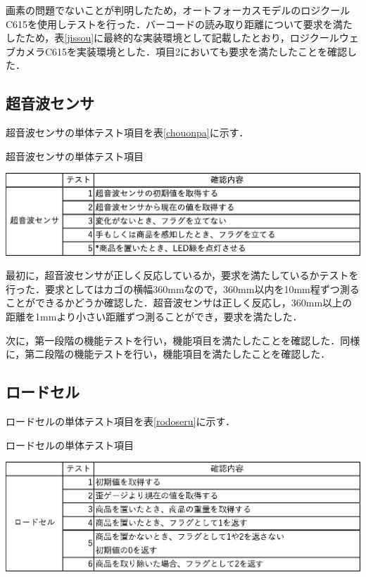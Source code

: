 画素の問題でないことが判明したため，オートフォーカスモデルのロジクールC615を使用しテストを行った．バーコードの読み取り距離について要求を満たしたため，表\ref{jissou}に最終的な実装環境として記載したとおり，ロジクールウェブカメラC615を実装環境とした．項目2においても要求を満たしたことを確認した．


\subsection*{超音波センサ}

超音波センサの単体テスト項目を表\ref{chouonpa}に示す．

\begin{table}[htbp]
\centering
\caption{超音波センサの単体テスト項目}
\includegraphics[width = 15cm]{./picture/chouonpa.eps}
\label{chouonpa}
\end{table}

最初に，超音波センサが正しく反応しているか，要求を満たしているかテストを行った．要求としてはカゴの横幅360mmなので，360mm以内を10mm程ずつ測ることができるかどうか確認した．超音波センサは正しく反応し，360mm以上の距離を1mmより小さい距離ずつ測ることができ，要求を満たした．

次に，第一段階の機能テストを行い，機能項目を満たしたことを確認した．同様に，第二段階の機能テストを行い，機能項目を満たしたことを確認した．

\subsection*{ロードセル}

ロードセルの単体テスト項目を表\ref{rodoseru}に示す．

\begin{table}[htbp]
\centering
\caption{ロードセルの単体テスト項目}
\includegraphics[width = 15cm]{./picture/rodoseru.eps}
\label{rodoseru}
\end{table}

